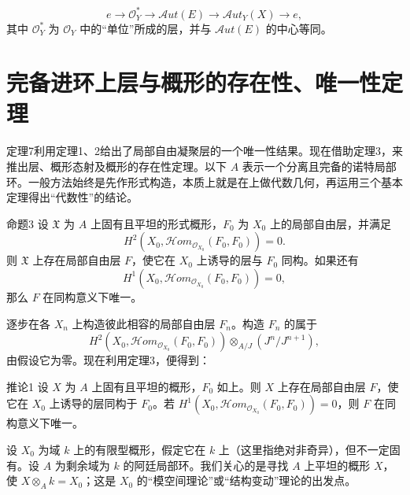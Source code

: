 \[
e\longrightarrow\mathcal O_Y^*\longrightarrow\mathcal A ut(E)
\longrightarrow\mathcal A ut_Y(X)\longrightarrow e,
\]
其中 $\mathcal O_Y^*$ 为 $\mathcal O_Y$ 中的“单位”所成的层，并与 $\mathcal A ut(E)$ 的中心等同。

\section{完备进环上层与概形的存在性、唯一性定理}
定理7利用定理1、2给出了局部自由凝聚层的一个唯一性结果。现在借助定理3，来推出层、概形态射及概形的存在性定理。以下 $A$ 表示一个分离且完备的诺特局部环。一般方法始终是先作形式构造，本质上就是在上做代数几何，再运用三个基本定理得出“代数性”的结论。

\begin{statement}{命题3}
设 $\mathfrak X$ 为 $A$ 上固有且平坦的形式概形，$F_0$ 为 $X_0$ 上的局部自由层，并满足
\[
H^2(X_0,\mathcal H om_{\mathcal O_{X_0}}(F_0,F_0))=0.
\]
则 $\mathfrak X$ 上存在局部自由层 $F$，使它在 $X_0$ 上诱导的层与 $F_0$ 同构。如果还有
\[
H^1(X_0,\mathcal H om_{\mathcal O_{X_0}}(F_0,F_0))=0,
\]
那么 $F$ 在同构意义下唯一。
\end{statement}
逐步在各 $X_n$ 上构造彼此相容的局部自由层 $F_n$。构造 $F_n$ 的属于
\[
H^2(X_0,\mathcal H om_{\mathcal O_{X_0}}(F_0,F_0))
\otimes_{A/J}(J^n/J^{n+1}),
\]
由假设它为零。现在利用定理3，便得到：
\begin{statement}{推论1}
设 $X$ 为 $A$ 上固有且平坦的概形，$F_0$ 如上。则 $X$ 上存在局部自由层 $F$，使它在 $X_0$ 上诱导的层同构于 $F_0$。若 $H^1(X_0,\mathcal H om_{\mathcal O_{X_0}}(F_0,F_0))=0$，则 $F$ 在同构意义下唯一。
\end{statement}
设 $X_0$ 为域 $k$ 上的有限型概形，假定它在 $k$ 上（这里指绝对非奇异），但不一定固有。设 $A$ 为剩余域为 $k$ 的阿廷局部环。我们关心的是寻找 $A$ 上平坦的概形 $X$，使 $X\otimes_Ak=X_0$；这是 $X_0$ 的“模空间理论”或“结构变动”理论的出发点。

